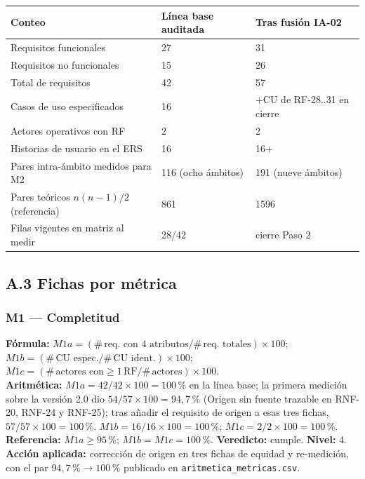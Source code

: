 \begin{center}
\begin{tabular}{@{}p{6.8cm}@{\;}p{3.4cm}@{\;}p{3.4cm}@{}}
\hline
\textbf{Conteo} & \textbf{L\'inea base auditada} & \textbf{Tras fusi\'on IA-02} \\
\hline
Requisitos funcionales & 27 & 31 \\
Requisitos no funcionales & 15 & 26 \\
Total de requisitos & 42 & 57 \\
Casos de uso especificados & 16 & +CU de RF-28..31 en cierre \\
Actores operativos con RF & 2 & 2 \\
Historias de usuario en el ERS & 16 & 16+ \\
Pares intra-\'ambito medidos para M2 & 116 (ocho \'ambitos) & 191 (nueve \'ambitos) \\
Pares te\'oricos $n(n-1)/2$ (referencia) & 861 & 1596 \\
Filas vigentes en matriz al medir & 28/42 & cierre Paso 2 \\
\hline
\end{tabular}
\end{center}

\subsection*{A.3 Fichas por m\'etrica}

\subsubsection*{M1 --- Completitud}
\textbf{F\'ormula:} $M1a = (\#\,\text{req.\ con 4 atributos}/\#\,\text{req.\ totales})\times100$; $M1b = (\#\,\text{CU espec.}/\#\,\text{CU ident.})\times100$; $M1c = (\#\,\text{actores con}\geq1\,\text{RF}/\#\,\text{actores})\times100$.\\
\textbf{Aritm\'etica:} $M1a = 42/42\times100 = 100\,\%$ en la l\'inea base; la primera medici\'on sobre la versi\'on 2.0 dio $54/57\times100 = 94{,}7\,\%$ (Origen sin fuente trazable en RNF-20, RNF-24 y RNF-25); tras a\~nadir el requisito de origen a esas tres fichas, $57/57\times100 = 100\,\%$. $M1b = 16/16\times100 = 100\,\%$; $M1c = 2/2\times100 = 100\,\%$.\\
\textbf{Referencia:} $M1a\geq95\,\%$; $M1b=M1c=100\,\%$. \textbf{Veredicto:} cumple. \textbf{Nivel:} 4. \textbf{Acci\'on aplicada:} correcci\'on de origen en tres fichas de equidad y re-medici\'on, con el par $94{,}7\,\%\rightarrow100\,\%$ publicado en \texttt{aritmetica\_metricas.csv}.

